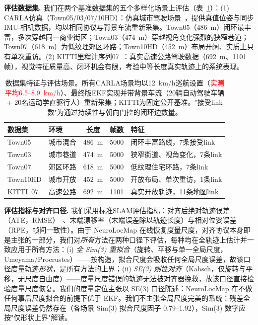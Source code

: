 \textbf{评估数据集.} 我们在两个基准数据集的五个多样化场景上评估（表~\ref{tab:datasets}）：(1) CARLA仿真（Town05/03/07/10HD）：仿真城市驾驶场景~\cite{dosovitskiy2017carla}，提供真值位姿与同步IMU-相机数据，均以相同协议与背景车流重新采集。Town05（486~m）闭环最丰富，多次穿越同一商业街区；Town03（474~m）穿越视角变化强烈的狭窄巷道；Town07（618~m）为低纹理郊区环路；Town10HD（452~m）布局开阔、实质上只有单次重访。(2) KITTI里程计序列07~\cite{geiger2012kitti}：真实高速公路驾驶数据（692~m、1101帧），视觉特征质量高、闭环机会有限，考验中等长度真实轨迹上的系统表现。

\begin{table}[!t]
    \centering
    \setlength{\tabcolsep}{2.8pt}
    \footnotesize
    \caption{数据集特征与评估场景。所有CARLA场景均以12~km/h巡航设置（\textcolor{red}{实测平均6.5--8.9~km/h}）、最终版EKF实现并带背景车流（20辆自动驾驶车辆 + 20名运动学直驱行人）重新采集；KITTI为固定公开基准。"接受link数"为通过持续性与朝向门控的闭环边数量。}
    \label{tab:datasets}
    \begin{tabular}{@{}llccl@{}}
        \toprule
        数据集  & 环境 & 长度 & 帧数 & 特征                    \\
        \midrule
        Town05   & 城市混合  & 486~m  & 5000   & 闭环丰富路线，7条接受link  \\
        Town03   & 城市巷道  & 474~m  & 5000   & 狭窄街道、视角变化，7条link \\
        Town07   & 郊区环路  & 618~m  & 5000   & 低纹理住宅环路，7条link \\
        Town10HD & 城市开放  & 452~m  & 5000   & 开放布局、单次重访，1条link \\
        KITTI~07 & 高速公路     & 692~m  & 1101   & 真实开放轨迹，11条地图link   \\
        \bottomrule
    \end{tabular}
\end{table}

\textbf{评估指标与对齐口径.} 我们采用标准SLAM评估指标：对齐后绝对轨迹误差（ATE，RMSE）~\cite{sturm2012benchmark}、末端漂移率（末端误差除以轨迹长度）与相对位姿误差（RPE，帧间一致性）。由于 NeuroLocMap 在线恢复度量尺度，对齐协议本身即是主张的一部分，我们对\emph{所有}方法在两种口径下评估，每种均在全轨迹上估计并一致应用于所有方法：(i) \emph{全 Sim(3) 重拟合}（旋转、平移与单一全局尺度，Umeyama/Procrustes）——按构造，拟合尺度会吸收任何全局尺度误差，故该口径度量轨迹\emph{形状}，是所有方法的上界；(ii) \emph{SE(3) 刚性对齐}（Kabsch，仅旋转与平移，无尺度自由度）——度量尺度错误的轨迹无法被对齐器挽救，故该口径直接检验度量尺度恢复。我们的度量定位主张以 SE(3) 口径陈述：NeuroLocMap 在不做任何事后尺度拟合的前提下优于 EKF。我们不主张全局尺度完美的系统：残差全局尺度误差仍然存在（各场景 Sim(3) 拟合尺度因子 0.79--1.92），Sim(3) 数字应按"仅形状上界"解读。

